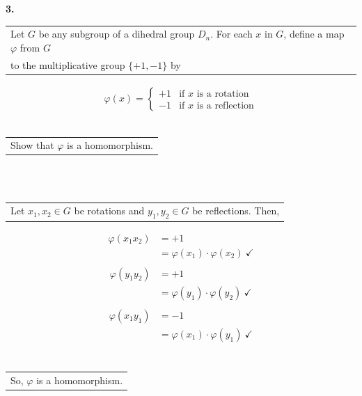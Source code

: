 \documentclass[12pt, letterpaper]{article}
\begin{document}
  \noindent \textbf{3.} \begin{tabular}[t]{l}
    Let $G$ be any subgroup of a dihedral group $D_n$. For each $x$ in $G$, define a map $\varphi$ from $G$ \\
    to the multiplicative group $\{+1, -1\}$ by 
    \end{tabular} 
    \begin{align*}
      \varphi(x) = 
      \begin{cases}
        +1 & \text{if } x \text{ is a rotation} \\
        -1 & \text{if } x \text{ is a reflection}
      \end{cases}
    \end{align*}
    \indent \indent \  \begin{tabular}[t]{l}
      Show that $\varphi$ is a homomorphism.
      \end{tabular} \vspace{0.5em} \\
      \indent \indent \ \begin{tabular}[t]{l}
        Let $x_1, x_2 \in G$ be rotations and $y_1, y_2 \in G$ be reflections. Then, \\
      \end{tabular}
      \begin{align*}
        \varphi(x_1x_2) &= +1 \\
        &= \varphi(x_1) \cdot \varphi(x_2) \ \checkmark \\
      \end{align*}
      \begin{align*}
        \varphi(y_1y_2) &= +1 \\
        &= \varphi(y_1) \cdot \varphi(y_2) \ \checkmark \\
      \end{align*}
      \begin{align*}
        \varphi(x_1y_1) &= -1 \\
        &= \varphi(x_1) \cdot \varphi(y_1) \ \checkmark \\
      \end{align*}
      \indent \indent \ \begin{tabular}[t]{l}
        So, $\varphi$ is a homomorphism.
        \end{tabular} \vspace{0.5em} 
\end{document}
